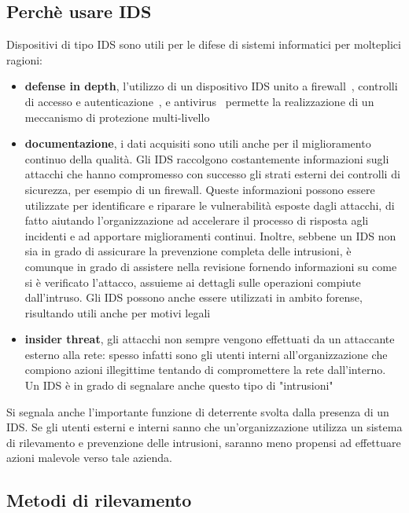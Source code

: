 \documentclass[../main.tex]{subfiles}
\begin{document}
\subsection{Perchè usare IDS}
Dispositivi di tipo IDS sono utili per le difese di sistemi informatici per molteplici ragioni:
\begin{itemize}
				\item \textbf{defense in depth}, l'utilizzo di un dispositivo IDS unito a firewall~\cite{idswithfirewall}, controlli di accesso e autenticazione~\cite{idswithacl}, e antivirus~\cite{idswithav} permette la realizzazione di un meccanismo di protezione multi-livello 
				\item \textbf{documentazione}, i dati acquisiti sono utili anche per il miglioramento continuo della qualità. Gli IDS raccolgono costantemente informazioni sugli attacchi che hanno compromesso con successo gli strati esterni dei controlli di sicurezza, per esempio di un firewall. Queste informazioni possono essere utilizzate per identificare e riparare le vulnerabilità esposte dagli attacchi, di fatto aiutando l'organizzazione ad accelerare il processo di risposta agli incidenti e ad apportare miglioramenti continui.
Inoltre, sebbene un IDS non sia in grado di assicurare la prevenzione completa delle intrusioni, è comunque in grado di assistere nella revisione fornendo informazioni su come si è verificato l'attacco, assuieme ai dettagli sulle operazioni compiute dall'intruso. Gli IDS possono anche essere utilizzati in ambito forense, risultando utili anche per motivi legali \cite{IPS}
				\item \textbf{insider threat}, gli attacchi non sempre vengono effettuati da un attaccante esterno alla rete: spesso infatti sono gli utenti interni all'organizzazione che compiono azioni illegittime tentando di compromettere la rete dall'interno. Un IDS è in grado di segnalare anche questo tipo di "intrusioni"~\cite{IPS}
\end{itemize}

Si segnala anche l'importante funzione di deterrente svolta dalla presenza di un IDS. Se gli utenti esterni e interni sanno che un'organizzazione utilizza un sistema di rilevamento e prevenzione delle intrusioni, saranno meno propensi ad effettuare azioni malevole verso tale azienda\cite{IPS}.

\subsection{Metodi di rilevamento}
\end{document}
